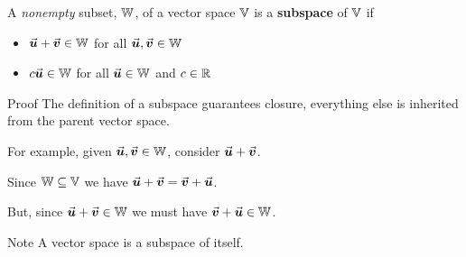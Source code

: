 \documentclass{beamer}
\begin{document}
\begin{frame}
\begin{theorem}
A \emph{nonempty} subset, $\mathbb{W}$, of a vector space $\mathbb{V}$ is a \textbf{subspace} of $\mathbb{V}$ if
\begin{itemize}
\item ${\vec{\boldsymbol{u}}}+{\vec{\boldsymbol{v}}}\in\mathbb{W}$ for all ${\vec{\boldsymbol{u}}},{\vec{\boldsymbol{v}}}\in\mathbb{W}$
\item $c{\vec{\boldsymbol{u}}}\in\mathbb{W}$ for all ${\vec{\boldsymbol{u}}}\in\mathbb{W}$ and $c\in\mathbb{R}$
\end{itemize}
\end{theorem}\pause
\begin{block}{Proof}
The definition of a subspace guarantees closure, everything else is inherited from the parent vector space.

\vspace{0.25cm}
For example, given ${\vec{\boldsymbol{u}}},{\vec{\boldsymbol{v}}}\in\mathbb{W}$, consider ${\vec{\boldsymbol{u}}}+{\vec{\boldsymbol{v}}}$.\pause

Since $\mathbb{W}\subseteq\mathbb{V}$ we have ${\vec{\boldsymbol{u}}}+{\vec{\boldsymbol{v}}}={\vec{\boldsymbol{v}}}+{\vec{\boldsymbol{u}}}$.\pause

But, since ${\vec{\boldsymbol{u}}}+{\vec{\boldsymbol{v}}}\in\mathbb{W}$ we must have ${\vec{\boldsymbol{v}}}+{\vec{\boldsymbol{u}}}\in\mathbb{W}$.
\end{block}\pause
\begin{block}{Note}
A vector space is a subspace of itself.
\end{block}
\end{frame}
\end{document}
